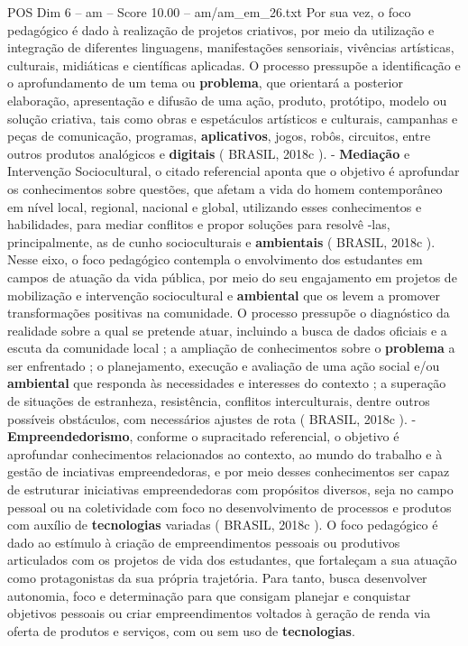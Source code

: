 \begin{textsample}{POS Dim 6 – am – Score 10.00 – am/am\_em\_26.txt}
Por sua vez, o foco pedagógico é dado à realização de projetos criativos, por meio da utilização e integração de diferentes linguagens, manifestações sensoriais, vivências artísticas, culturais, midiáticas e científicas aplicadas.
O processo pressupõe a identificação e o aprofundamento de um tema ou \textbf{problema}, que orientará a posterior elaboração, apresentação e difusão de uma ação, produto, protótipo, modelo ou solução criativa, tais como obras e espetáculos artísticos e culturais, campanhas e peças de comunicação, programas, \textbf{aplicativos}, jogos, robôs, circuitos, entre outros produtos analógicos e \textbf{digitais} ( BRASIL, 2018c ). - \textbf{Mediação} e Intervenção Sociocultural, o citado referencial aponta que o objetivo é aprofundar os conhecimentos sobre questões, que afetam a vida do homem contemporâneo em nível local, regional, nacional e global, utilizando esses conhecimentos e habilidades, para mediar conflitos e propor soluções para resolvê -las, principalmente, as de cunho socioculturais e \textbf{ambientais} ( BRASIL, 2018c ).
Nesse eixo, o foco pedagógico contempla o envolvimento dos estudantes em campos de atuação da vida pública, por meio do seu engajamento em projetos de mobilização e intervenção sociocultural e \textbf{ambiental} que os levem a promover transformações positivas na comunidade.
O processo pressupõe o diagnóstico da realidade sobre a qual se pretende atuar, incluindo a busca de dados oficiais e a escuta da comunidade local ; a ampliação de conhecimentos sobre o \textbf{problema} a ser enfrentado ; o planejamento, execução e avaliação de uma ação social e/ou \textbf{ambiental} que responda às necessidades e interesses do contexto ; a superação de situações de estranheza, resistência, conflitos interculturais, dentre outros possíveis obstáculos, com necessários ajustes de rota ( BRASIL, 2018c ). - \textbf{Empreendedorismo}, conforme o supracitado referencial, o objetivo é aprofundar conhecimentos relacionados ao contexto, ao mundo do trabalho e à gestão de inciativas empreendedoras, e por meio desses conhecimentos ser capaz de estruturar iniciativas empreendedoras com propósitos diversos, seja no campo pessoal ou na coletividade com foco no desenvolvimento de processos e produtos com auxílio de \textbf{tecnologias} variadas ( BRASIL, 2018c ).
O foco pedagógico é dado ao estímulo à criação de empreendimentos pessoais ou produtivos articulados com os projetos de vida dos estudantes, que fortaleçam a sua atuação como protagonistas da sua própria trajetória.
Para tanto, busca desenvolver autonomia, foco e determinação para que consigam planejar e conquistar objetivos pessoais ou criar empreendimentos voltados à geração de renda via oferta de produtos e serviços, com ou sem uso de \textbf{tecnologias}.

\end{textsample}
